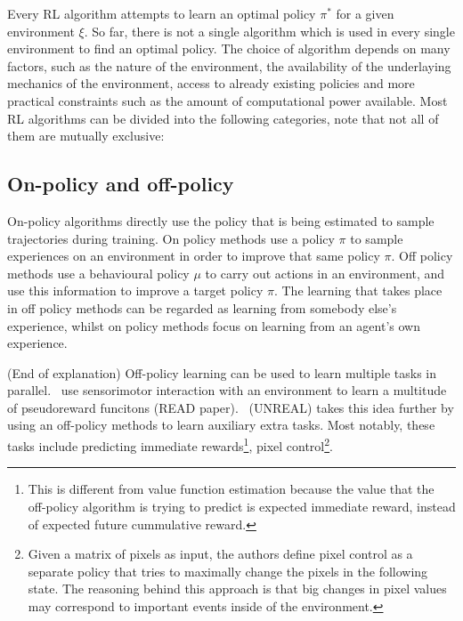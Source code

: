 \documentclass{../main.tex}{}
\begin{document}


Every RL algorithm attempts to learn an optimal policy $\pi^*$ for a given environment $\xi$. So far, there is not a single algorithm which is used in every single environment to find an optimal policy. The choice of algorithm depends on many factors, such as the nature of the environment, the availability of the underlaying mechanics of the environment, access to already existing policies and more practical constraints such as the amount of computational power available. Most RL algorithms can be divided into the following categories, note that not all of them are mutually exclusive:

\subsection{On-policy and off-policy}

On-policy algorithms directly use the policy that is being estimated to sample trajectories during training. On policy methods use a policy $\pi$ to sample experiences on an environment in order to improve that same policy $\pi$. Off policy methods use a behavioural policy $\mu$ to carry out actions in an environment, and use this information to improve a target policy $\pi$. The learning that takes place in off policy methods can be regarded as learning from somebody else's experience, whilst on policy methods focus on learning from an agent's own experience.

(End of explanation)
Off-policy learning can be used to learn multiple tasks in parallel.~\cite{Sutton2010} use sensorimotor interaction with an environment to learn a multitude of pseudoreward funcitons (READ paper).~\cite{Jaderberg2016} (UNREAL) takes this idea further by using an off-policy methods to learn auxiliary extra tasks. Most notably, these tasks include predicting immediate rewards\footnote{This is different from value function estimation because the value that the off-policy algorithm is trying to predict is expected immediate reward, instead of expected future cummulative reward.}, pixel control\footnote{Given a matrix of pixels as input, the authors define pixel control as a separate policy that tries to maximally change the pixels in the following state. The reasoning behind this approach is that big changes in pixel values may correspond to important events inside of the environment.}.
\end{document}
